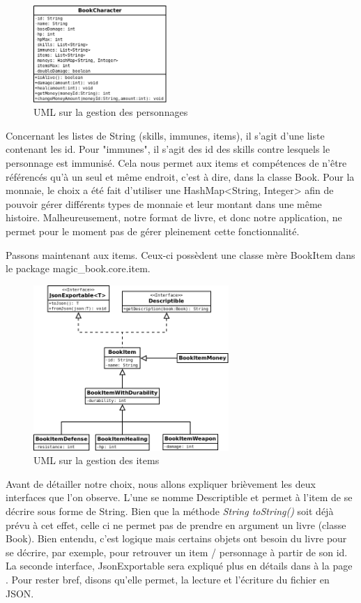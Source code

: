 			\begin{figure}[H]
				\centering\includegraphics[width=0.45\textwidth, keepaspectratio]{img/book_character.png}
				\caption{UML sur la gestion des personnages}
			\end{figure}

			Concernant les listes de String (skills, immunes, items), il s'agit d'une liste contenant les id. Pour "immunes", il s'agit des id des skills contre lesquels le personnage est immunisé. Cela nous permet aux items et compétences de n'être référencés qu'à un seul et même endroit, c'est à dire, dans la classe Book. Pour la monnaie, le choix a été fait d'utiliser une HashMap<String, Integer> afin de pouvoir gérer différents types de monnaie et leur montant dans une même histoire. Malheureusement, notre format de livre, et donc notre application, ne permet pour le moment pas de gérer pleinement cette fonctionnalité.

			Passons maintenant aux items. Ceux-ci possèdent une classe mère BookItem dans le package magic\_book.core.item.

			\begin{figure}[H]
				\centering\includegraphics[width=0.66\textwidth, keepaspectratio]{img/book_item.png}
				\caption{UML sur la gestion des items}
			\end{figure}

			Avant de détailler notre choix, nous allons expliquer brièvement les deux interfaces que l'on observe. L'une se nomme Descriptible et permet à l'item de se décrire sous forme de String. Bien que la méthode \textit{String toString()} soit déjà prévu à cet effet, celle ci ne permet pas de prendre en argument un livre (classe Book). Bien entendu, c'est logique mais certains objets ont besoin du livre pour se décrire, par exemple, pour retrouver un item / personnage à partir de son id. La seconde interface, JsonExportable sera expliqué plus en détails dans  à la page \pageref{subsec:lecture_ecriture_fichier}. Pour rester bref, disons qu'elle permet, la lecture et l'écriture du fichier en JSON.

